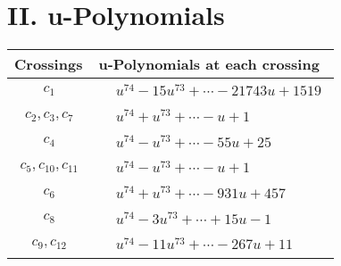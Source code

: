 \documentclass[1p]{elsarticle_modified}
\theoremstyle{definition}
\begin{document}
\newpage\renewcommand{\arraystretch}{1}
\centering \section*{ II. u-Polynomials}
\begin{tabular}{m{50pt}|m{274pt}}
Crossings & \hspace{64pt}u-Polynomials at each crossing \\
\hline $$\begin{aligned}c_{1}\end{aligned}$$&$\begin{aligned}
&u^{74}-15 u^{73}+\cdots-21743 u+1519
\end{aligned}$\\
\hline $$\begin{aligned}c_{2},c_{3},c_{7}\end{aligned}$$&$\begin{aligned}
&u^{74}+u^{73}+\cdots- u+1
\end{aligned}$\\
\hline $$\begin{aligned}c_{4}\end{aligned}$$&$\begin{aligned}
&u^{74}- u^{73}+\cdots-55 u+25
\end{aligned}$\\
\hline $$\begin{aligned}c_{5},c_{10},c_{11}\end{aligned}$$&$\begin{aligned}
&u^{74}- u^{73}+\cdots- u+1
\end{aligned}$\\
\hline $$\begin{aligned}c_{6}\end{aligned}$$&$\begin{aligned}
&u^{74}+u^{73}+\cdots-931 u+457
\end{aligned}$\\
\hline $$\begin{aligned}c_{8}\end{aligned}$$&$\begin{aligned}
&u^{74}-3 u^{73}+\cdots+15 u-1
\end{aligned}$\\
\hline $$\begin{aligned}c_{9},c_{12}\end{aligned}$$&$\begin{aligned}
&u^{74}-11 u^{73}+\cdots-267 u+11
\end{aligned}$\\
\hline
\end{tabular}\newpage\renewcommand{\arraystretch}{1}
\end{document}
